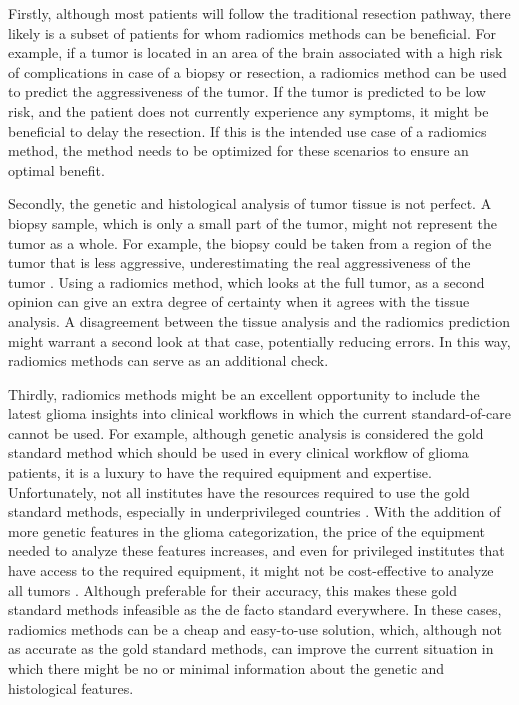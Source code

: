 Firstly, although most patients will follow the traditional resection pathway, there likely is a subset of patients for whom radiomics methods can be beneficial.
For example, if a \gls{tumor} is located in an area of the brain associated with a high risk of complications in case of a biopsy or resection, a radiomics method can be used to predict the aggressiveness of the \gls{tumor}.
If the \gls{tumor} is predicted to be low risk, and the patient does not currently experience any symptoms, it might be beneficial to delay the resection.
If this is the intended use case of a radiomics method, the method needs to be optimized for these scenarios to ensure an optimal benefit.

Secondly, the genetic and histological analysis of \gls{tumor} tissue is not perfect.
A biopsy sample, which is only a small part of the \gls{tumor}, might not represent the \gls{tumor} as a whole.
For example, the biopsy could be taken from a region of the \gls{tumor} that is less aggressive, underestimating the real aggressiveness of the \gls{tumor} \autocite{muragaki2008biopsy}.
Using a radiomics method, which looks at the full \gls{tumor}, as a second opinion can give an extra degree of certainty when it agrees with the tissue analysis.
A disagreement between the tissue analysis and the radiomics prediction might warrant a second look at that case, potentially reducing errors.
In this way, radiomics methods can serve as an additional check.

Thirdly, radiomics methods might be an excellent opportunity to include the latest glioma insights into clinical workflows in which the current standard-of-care cannot be used.
For example, although genetic analysis is considered the gold standard method which should be used in every clinical workflow of glioma patients, it is a luxury to have the required equipment and expertise.
Unfortunately, not all institutes have the resources required to use the gold standard methods, especially in underprivileged countries \autocite{santosh2019india}.
With the addition of more genetic features in the glioma categorization, the price of the equipment needed to analyze these features increases, and even for privileged institutes that have access to the required equipment, it might not be cost-effective to analyze all \glspl{tumor} \autocite{malzkorn2016practical,dewitt2017costIDH}.
Although preferable for their accuracy, this makes these gold standard methods infeasible as the de facto standard everywhere.
In these cases, radiomics methods can be a cheap and easy-to-use solution, which, although not as accurate as the gold standard methods, can improve the current situation in which there might be no or minimal information about the genetic and histological features.

